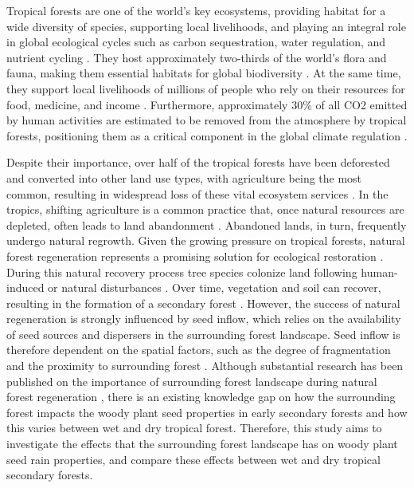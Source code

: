 Tropical forests are one of the world's key ecosystems, providing habitat for a wide diversity of species, supporting local livelihoods, and playing an integral role in global ecological cycles such as carbon sequestration, water regulation, and nutrient cycling \citep{bormaCarbonContributionsSouth2022}. They host approximately two-thirds of the world's flora and fauna, making them essential habitats for global biodiversity \citep{mulatuBiodiversityMonitoringChanging2017}. At the same time, they support local livelihoods of millions of people who rely on their resources for food, medicine, and income \citep{bormaCarbonContributionsSouth2022}. Furthermore, approximately 30\% of all CO2 emitted by human activities are estimated to be removed from the atmosphere by tropical forests, positioning them as a critical component in the global climate regulation \citep{bormaCarbonContributionsSouth2022}. 

Despite their importance, over half of the tropical forests have been deforested and converted into other land use types, with agriculture being the most common, resulting in widespread loss of these vital ecosystem services \citep{chazdonNaturalRegenerationTool2016, arroyo-rodriguezMultipleSuccessionalPathways2017}. In the tropics, shifting agriculture is a common practice that, once natural resources are depleted, often leads to land abandonment \citep{hordijkLandUseHistory2024}. Abandoned lands, in turn, frequently undergo natural regrowth. Given the growing pressure on tropical forests, natural forest regeneration represents a promising solution for ecological restoration \citep{hordijkLandUseHistory2024}. During this natural recovery process tree species colonize land following human-induced or natural disturbances \citep{crouzeillesEcologicalRestorationSuccess2017}. Over time, vegetation and soil can recover, resulting in the formation of a secondary forest \citep{chazdonSecondGrowthPromise2014}. However, the success of natural regeneration is strongly influenced by seed inflow, which relies on the availability of seed sources and dispersers in the surrounding forest landscape. Seed inflow is therefore dependent on the spatial factors, such as the degree of fragmentation and the proximity to surrounding forest \citep{arroyo-rodriguezMultipleSuccessionalPathways2017}. Although substantial research has been published on the importance of surrounding forest landscape during natural forest regeneration \citep{arroyo-rodriguezMultipleSuccessionalPathways2017, v.h.safarLandscapeOpennessHas2022a}, there is an existing knowledge gap on how the surrounding forest impacts the woody plant seed properties in early secondary forests and how this varies between wet and dry tropical forest. Therefore, this study aims to investigate the effects that the surrounding forest landscape has on woody plant seed rain properties, and compare these effects between wet and dry tropical secondary forests.

